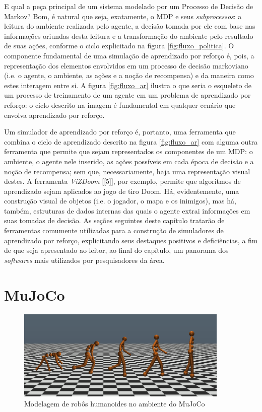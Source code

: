 \documentclass[cic,tc]{iiufrgs}
\begin{document}
E qual a peça principal de um sistema modelado por um Processo de Decisão de
Markov? Bom, é natural que seja, exatamente, o MDP e seus \textit{subprocessos}:
a leitura do ambiente realizada pelo agente, a decisão tomada por ele com base
nas informações oriundas desta leitura e a transformação do ambiente pelo
resultado de suas ações, conforme o ciclo explicitado na figura
\ref{fig:fluxo_politica}. O componente fundamental de uma simulação de
aprendizado por reforço é, pois, a representação dos elementos envolvidos em um
processo de decisão markoviano (i.e. o agente, o ambiente, as ações e a noção de
recompensa) e da maneira como estes interagem entre si. A figura
\ref{fig:fluxo_ar} ilustra o que seria o esqueleto de um processo de treinamento
de um agente em um problema de aprendizado por reforço: o ciclo descrito na
imagem é fundamental em qualquer cenário que envolva aprendizado por reforço.


Um simulador de aprendizado por reforço é, portanto, uma ferramenta que combina
o ciclo de aprendizado descrito na figura \ref{fig:fluxo_ar} com alguma outra
ferramenta que permite que sejam representados os componentes de um MDP: o
ambiente, o agente nele inserido, as ações possíveis em cada época de decisão e
a noção de recompensa; sem que, necessariamente, haja uma representação visual
destes. A ferramenta \textit{ViZDoom} [[5]], por exemplo, permite que algoritmos
de aprendizado sejam aplicados ao jogo de tiro Doom. Há, evidentemente, uma
construção visual de objetos (i.e. o jogador, o mapa e os inimigos), mas há,
também, estruturas de dados internas das quais o agente extrai informações em
suas tomadas de decisão. As seções seguintes deste capítulo tratarão de
ferramentas comumente utilizadas para a construção de simuladores de aprendizado
por reforço, explicitando seus destaques positivos e deficiências, a fim de que
seja apresentado ao leitor, ao final do capítulo, um panorama dos
\textit{softwares} mais utilizados por pesquisadores da área.


\section{MuJoCo}
\label{mujoco}

\begin{figure}[h]
    \caption{Modelagem de robôs humanoides no ambiente do MuJoCo}
    \begin{center}
      \includegraphics[width=0.9\textwidth]{mujoco_humanoids.png}
    \end{center}
    \label{fig:humanoids_mujoco}
\end{figure}
\end{document}
